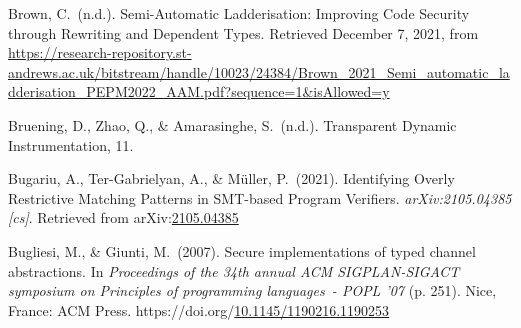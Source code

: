 \documentclass[12pt,twoside]{article}
\begin{document}
{\begin{thebibliography}{1079}
\mdbibitemlabel{}Brown, C.~(n.d.). Semi-Automatic Ladderisation: Improving Code Security through Rewriting and Dependent Types. Retrieved December 7, 2021, from \href{https://research-repository.st-andrews.ac.uk/bitstream/handle/10023/24384/Brown_2021_Semi_automatic_ladderisation_PEPM2022_AAM.pdf?sequence=1\%26isAllowed=y}{{\ttfamily https://\hspace{0pt}research-\hspace{0pt}repository.\hspace{0pt}st-\hspace{0pt}andrews.\hspace{0pt}ac.\hspace{0pt}uk/\hspace{0pt}bitstream/\hspace{0pt}handle/\hspace{0pt}10023/\hspace{0pt}24384/\hspace{0pt}Brown\_\hspace{0pt}2021\_\hspace{0pt}Semi\_\hspace{0pt}automatic\_\hspace{0pt}ladderisation\_\hspace{0pt}PEPM2022\_\hspace{0pt}AAM.\hspace{0pt}pdf?\hspace{0pt}sequence=\hspace{0pt}1\&\hspace{0pt}isAllowed=\hspace{0pt}y}}%

\mdbibitemlabel{}Bruening, D., Zhao, Q., \& Amarasinghe, S.~(n.d.). Transparent Dynamic Instrumentation, 11.%

\mdbibitemlabel{}Bugariu, A., Ter-Gabrielyan, A., \& Müller, P.~(2021). Identifying Overly Restrictive Matching Patterns in SMT-based Program Verifiers. \emph{arXiv:2105.04385 {}[cs]}. Retrieved from arXiv:\href{http://arxiv.org/abs/2105.04385}{2105.04385}%

\mdbibitemlabel{}Bugliesi, M., \& Giunti, M.~(2007). Secure implementations of typed channel abstractions. In \emph{Proceedings of the 34th annual ACM SIGPLAN-SIGACT symposium on Principles of programming languages~- POPL ’07} (p. 251). Nice, France: ACM Press. https://doi.org/\href{https://dx.doi.org/10.1145/1190216.1190253}{10.1145/1190216.1190253}%


\end{thebibliography}}
\end{document}
